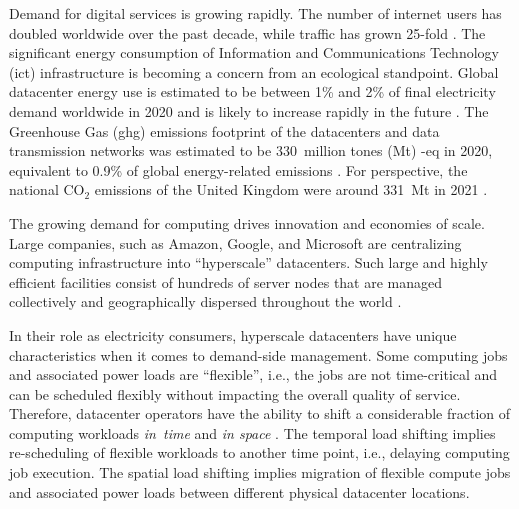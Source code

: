 %



Demand for digital services is growing rapidly. The number of internet users has doubled worldwide over the past decade, while traffic has grown 25-fold \cite{ieaDataCentresData2023}.
The significant energy consumption of Information and Communications Technology (\gls{ict}) infrastructure is becoming a concern from an ecological standpoint.
Global datacenter energy use is estimated to be between 1\% and 2\% of final electricity demand worldwide in 2020 \cite{myttonHowMuchEnergy2020, masanetRecalibratingGlobalData2020} and is likely to increase rapidly in the future \cite{andraeGlobalElectricityUsage2015}.
The Greenhouse Gas (\gls{ghg}) emissions footprint of the datacenters and data transmission networks was estimated to be 330~million tones (Mt) \co-eq in 2020, equivalent to 0.9\% of global energy-related emissions \cite{ieaDataCentresData2023, malmodinICTSectorElectricity2023}.
For perspective, the national CO$_2$ emissions of the United Kingdom were around 331~Mt in 2021 \cite{UKnationalstats}.


The growing demand for computing drives innovation and economies of scale. Large companies, such as Amazon, Google, and Microsoft are centralizing computing infrastructure into \enquote{hyperscale} datacenters.
Such large and highly efficient facilities consist of hundreds of server nodes that are managed collectively and geographically dispersed throughout the world \cite{ThereAre500}.

In their role as electricity consumers, hyperscale datacenters have unique characteristics when it comes to demand-side management.
Some computing jobs and associated power loads are \enquote{flexible}, i.e., the jobs are not time-critical and can be scheduled flexibly without impacting the overall quality of service.
Therefore, datacenter operators have the ability to shift a considerable fraction of computing workloads \textit{in~time} and \textit{in space} \cite{radovanovicIEEE2023}.
The temporal load shifting implies re-scheduling of flexible workloads to another time point, i.e., delaying computing job execution.
The spatial load shifting implies migration of flexible compute jobs and associated power loads between different physical datacenter locations.

